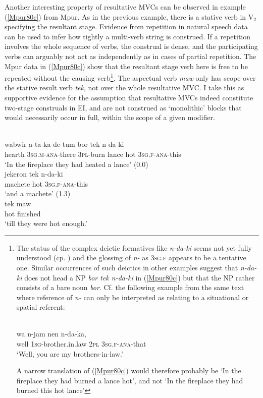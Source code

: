 Another interesting property of resultative MVCs can be observed in example (\ref{Mpur80c}) from Mpur. As in the previous example, there is a stative verb in V$_2$ specifying the resultant stage. Evidence from repetition in natural speech data can be used to infer how tightly a multi-verb string is construed. If a repetition involves the whole sequence of verbs, the construal is dense, and the participating verbs can arguably not act as independently as in cases of partial repetition. The Mpur data in (\ref{Mpur80c}) show that the resultant stage verb here is free to be repeated without the causing verb\footnote{The status of the complex deictic formatives like \textit{n-da-ki} seems not yet fully understood (cp. \citealt[64ff.]{ode2002sketch}) and the glossing of \textit{n-} as \textsc{3sg.f} appears to be a tentative one. Similar occurrences of such deictics in other examples suggest that \textit{n-da-ki} does not head a NP \textit{bor tek n-da-ki} in (\ref{Mpur80c}) but that the NP rather consists of a bare noun \textit{bor}. Cf. the following example from the same text where reference of \textit{n-} can only be interpreted as relating to a situational or spatial referent:

\ea \label{Mpur_p105}
\\
\gll wa n-jam nen n-da-ka, \\
well \textsc{1}\textsc{sg}-brother.in.law \textsc{2}\textsc{pl} \textsc{3}\textsc{sg}.\textsc{f}-\textsc{ana}-that \\
\glft `Well, you are my brothers-in-law.'\\ 
\z

A narrow translation of (\ref{Mpur80c}) would therefore probably be `In the fireplace they had burned a lance hot', and not `In the fireplace they had burned this hot lance'}. The aspectual verb \textit{maw} only has scope over the stative result verb \textit{tek}, not over the whole resultative MVC. I take this as supportive evidence for the assumption that resultative MVCs indeed constitute two-stage construals in EI, and are not construed as `monolithic' blocks that would necessarily occur in full, within the scope of a given modifier.

\ea \label{Mpur80c}
\\
\ea
\gll wabwir a-ta-ka de-tum bor tek n-da-ki \\
hearth \textsc{3}\textsc{sg}.\textsc{m}-\textsc{ana}-there \textsc{3}\textsc{pl}-burn lance hot \textsc{3}\textsc{sg}.\textsc{f}-\textsc{ana}-this \\
\glft `In the fireplace they had heated a lance' (0.0) \\ 
\ex
\gll jekeron tek n-da-ki\\ 
machete hot \textsc{3}\textsc{sg}.\textsc{f}-\textsc{ana}-this \\
\glft `and a machete' (1.3) \\ 
\ex
\gll tek maw \\ 
hot finished \\
\glft `till they were hot enough.'\\ 
\z
\z

